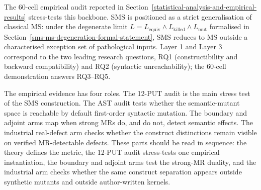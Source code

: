 \documentclass[manuscript,screen,review]{acmart}
\begin{document}
The 60-cell empirical audit reported in Section~\ref{statistical-analysis-and-empirical-results} stress-tests this
backbone. SMS is positioned as a strict generalisation of classical MS:
under the
degenerate limit $L = L_{\mathrm{equiv}} \wedge L_{\mathrm{killed}} \wedge L_{\mathrm{mut}}$
formalised in Section~\ref{sms-ms-degeneration-formal-statement}, SMS reduces to MS outside a
characterised exception set of pathological inputs. Layer 1 and
Layer 3 correspond to the two leading research questions, RQ1
(constructibility and backward compatibility) and RQ2 (syntactic
unreachability); the 60-cell demonstration answers RQ3--RQ5.

The empirical evidence has four roles. The 12-PUT audit is the main
stress test of the SMS construction. The AST audit tests whether the
semantic-mutant space is reachable by default first-order syntactic
mutation. The boundary and adjoint arms map when strong MRs do, and do
not, detect semantic effects. The industrial real-defect arm checks whether
the construct distinctions remain visible on verified MR-detectable defects.
These parts should be read in sequence: the theory defines the metric,
the 12-PUT audit stress-tests one empirical instantiation, the boundary
and adjoint arms test the strong-MR duality, and the industrial arm
checks whether the same construct separation appears outside synthetic
mutants and outside author-written kernels.
\end{document}
